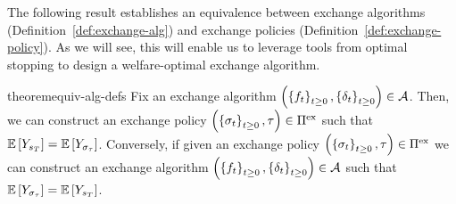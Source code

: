 
The 
following result establishes an equivalence between exchange algorithms (Definition~\ref{def:exchange-alg}) and exchange policies (Definition~\ref{def:exchange-policy}).
As we will see, this will enable us to leverage tools from optimal stopping to design a welfare-optimal exchange algorithm.


\begin{restatable}{theorem}{equiv-alg-defs}
    \label{thm:equiv-alg-defs}
    Fix an exchange algorithm
    \(
        \left(
            \left\{
                f_{t}
            \right\}_{t\geq 0}, 
            \left\{
                \delta_{t}
            \right\}_{t\geq 0}
        \right)
        \in
        \mathcal{A}
    \).
    Then, we can construct an exchange policy
    \(
        \left(
            \left\{
                \sigma_{t}
            \right\}_{t\geq 0},
            \tau 
        \right)
        \in
        \Pi^{\text{ex}}
    \) 
    such that 
    \(
        \mathbb{E}\left[
            Y_{
                s_{T}
            }
        \right]
        =
        \mathbb{E}\left[
            Y_{
                \sigma_{\tau}
            }
        \right]
    \).
    Conversely, if given an exchange policy
    \(
        \left(
            \left\{
                \sigma_{t}
            \right\}_{t\geq 0},
            \tau 
        \right)
        \in
        \Pi^{\text{ex}}
    \) 
    we can construct an exchange algorithm
    \(
        \left(
            \left\{
                f_{t}
            \right\}_{t\geq 0}, 
            \left\{
                \delta_{t}
            \right\}_{t\geq 0}
        \right)
        \in
        \mathcal{A}
    \)
    such that 
    \(
        \mathbb{E}\left[
            Y_{
                \sigma_{\tau}
            }
        \right]
        =
        \mathbb{E}\left[
            Y_{
                s_{T}
            }
        \right]
    \).
\end{restatable}  

